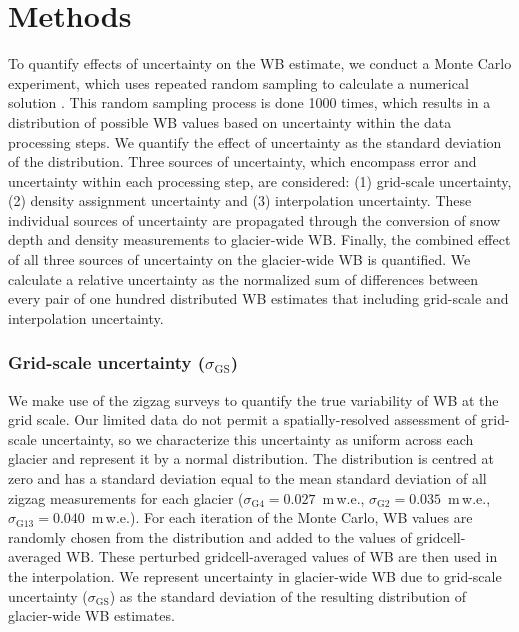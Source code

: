 \documentclass{sfuthesis}
\begin{document}
\section{Methods}
\label{sec:Unc_methods}

To quantify effects of uncertainty on the WB estimate, we conduct a Monte Carlo experiment, which uses repeated random sampling to calculate a numerical solution \citep{Metropolis1949}. This random sampling process is done 1000 times, which results in a distribution of possible WB values based on uncertainty within the data processing steps. We quantify the effect of uncertainty as the standard deviation of the distribution. Three sources of uncertainty, which encompass error and uncertainty within each processing step, are considered: (1) grid-scale uncertainty, (2) density assignment uncertainty and (3) interpolation uncertainty. These individual sources of uncertainty are propagated through the conversion of snow depth and density measurements to glacier-wide WB. Finally, the combined effect of all three sources of uncertainty on the glacier-wide WB is quantified. We calculate a relative uncertainty as the normalized sum of differences between every pair of one hundred distributed WB estimates that including grid-scale and interpolation uncertainty.

\subsubsection{Grid-scale uncertainty ($\sigma_{\mathrm{GS}}$)}
We make use of the zigzag surveys to quantify the true variability of WB at the grid scale. Our limited data do not permit a spatially-resolved assessment of grid-scale uncertainty, so we characterize this uncertainty as uniform across each glacier and represent it by a normal distribution. The distribution is centred at zero and has a standard deviation equal to the mean standard deviation of all zigzag measurements for each glacier ($\sigma_{\mathrm{G4}} = 0.027 $ \,m\,w.e., $\sigma_{\mathrm{G2}} = 0.035$ \,m\,w.e., $\sigma_{\mathrm{G13}} = 0.040 $ \,m\,w.e.). For each iteration of the Monte Carlo, WB values are randomly chosen from the distribution and added to the values of gridcell-averaged WB. These perturbed gridcell-averaged values of WB are then used in the interpolation. We represent uncertainty in glacier-wide WB due to grid-scale uncertainty ($\sigma_{\mathrm{GS}}$) as the standard deviation of the resulting distribution of glacier-wide WB estimates.  
\end{document}
